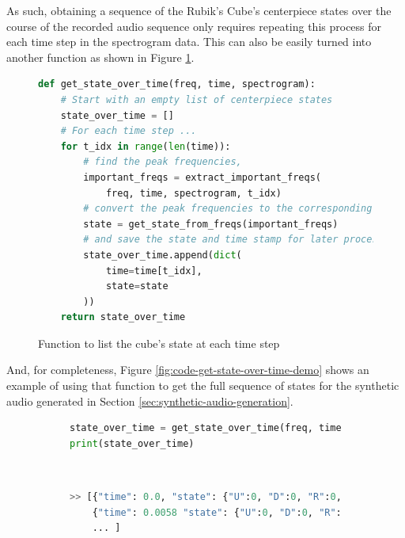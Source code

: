 As such, obtaining a sequence of the Rubik's Cube's centerpiece states
over the course of the recorded audio sequence only requires repeating
this process for each time step in the spectrogram data. This can also
be easily turned into another function as shown in Figure
\ref{fig:code-get-state-over-time}.

\begin{figure}[h]
\caption{Function to list the cube's state at each time step}
\label{fig:code-get-state-over-time}
\begin{lstlisting}[language=Python]
def get_state_over_time(freq, time, spectrogram):
    # Start with an empty list of centerpiece states
    state_over_time = []
    # For each time step ...
    for t_idx in range(len(time)):
        # find the peak frequencies,
        important_freqs = extract_important_freqs(
            freq, time, spectrogram, t_idx)
        # convert the peak frequencies to the corresponding state,
        state = get_state_from_freqs(important_freqs)
        # and save the state and time stamp for later processing.
        state_over_time.append(dict(
            time=time[t_idx],
            state=state
        ))
    return state_over_time
\end{lstlisting}
\end{figure}

And, for completeness, Figure \ref{fig:code-get-state-over-time-demo}
shows an example of using that function to get the full sequence of
states for the synthetic audio generated in Section
\ref{sec:synthetic-audio-generation}.

\begin{figure}[h]
\caption{Example listing of states over time}
\label{fig:code-get-state-over-time-demo} 
\begin{subfigure}{\textwidth}
\begin{lstlisting}[language=Python]
state_over_time = get_state_over_time(freq, time, spectrogram)
print(state_over_time)
\end{lstlisting}
\end{subfigure}\\

\begin{subfigure}{\textwidth}
\begin{lstlisting}[language=Python, numbers=none]
>> [{"time": 0.0, "state": {"U":0, "D":0, "R":0, "L":0, "F":0, "B":0}}, 
    {"time": 0.0058 "state": {"U":0, "D":0, "R":0, "L":0, "F":0, "B":0}},
    ... ]
\end{lstlisting}
\end{subfigure}
\end{figure}

